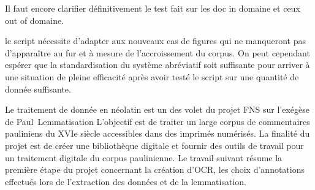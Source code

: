 Il faut encore clarifier définitivement le test fait sur les doc in domaine et ceux out of domaine.


le script nécessite d'adapter aux nouveaux cas de figures qui ne manqueront pas d'apparaître au fur et à mesure de l'accroissement du corpus. On peut cependant espérer que la standardisation du système abréviatif soit suffisante pour arriver à une situation de pleine efficacité après avoir testé le script sur une quantité de donnée suffisante.\par 
\FloatBarrier

Le traitement de donnée en néolatin est un des volet du projet FNS sur l'exégèse de Paul~\cite{exegesisofPaul_2023}Lemmatisation L'objectif est de traiter un large corpus de commentaires pauliniens du XVIe siècle accessibles dans des imprimés numérisés. La finalité du projet est de créer une bibliothèque digitale et fournir des outils de travail pour un traitement digitale du corpus paulinienne. Le travail suivant résume la première étape du projet concernant la création d'OCR, les choix d'annotations effectués lors de l'extraction des données et de la lemmatisation.

